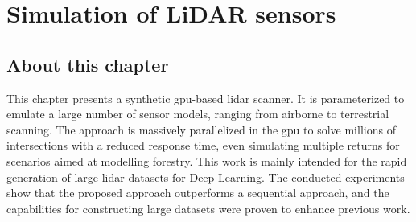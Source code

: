 \setchapterpreamble[u]{\margintoc}
\chapter{Simulation of LiDAR sensors}
\label{sec:lidar_simulation}

\section*{About this chapter}

This chapter presents a synthetic \acrshort{gpu}-based \acrshort{lidar} scanner. It is parameterized to emulate a large number of sensor models, ranging from airborne to terrestrial scanning. The approach is massively parallelized in the \acrshort{gpu} to solve millions of intersections with a reduced response time, even simulating multiple returns for scenarios aimed at modelling forestry. This work is mainly intended for the rapid generation of large \acrshort{lidar} datasets for Deep Learning. The conducted experiments show that the proposed approach outperforms a sequential approach, and the capabilities for constructing large datasets were proven to enhance previous work. 

